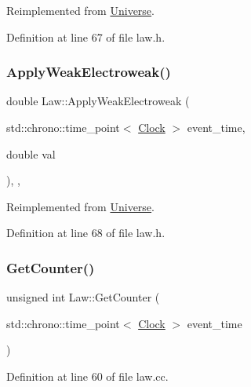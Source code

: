 Reimplemented from \mbox{\hyperlink{class_universe_a6d1226b3adec3c42a833afdbb6a65a92}{Universe}}.



Definition at line 67 of file law.\+h.

\mbox{\label{class_law_ae8a5d1d09686d79f7814c8800791460b}} 
\subsubsection{\texorpdfstring{Apply\+Weak\+Electroweak()}{ApplyWeakElectroweak()}}
{\footnotesize\ttfamily double Law\+::\+Apply\+Weak\+Electroweak (\begin{DoxyParamCaption}\item[{std\+::chrono\+::time\+\_\+point$<$ \mbox{\hyperlink{universe_8h_a0ef8d951d1ca5ab3cfaf7ab4c7a6fd80}{Clock}} $>$}]{event\+\_\+time,  }\item[{double}]{val }\end{DoxyParamCaption})\hspace{0.3cm}{\ttfamily [inline]}, {\ttfamily [final]}, {\ttfamily [virtual]}}



Reimplemented from \mbox{\hyperlink{class_universe_a46a906baabb63e5d31f8b48ea1fae52e}{Universe}}.



Definition at line 68 of file law.\+h.

\mbox{\label{class_law_ab30a86ef88a85e13d3e598caa45bff05}} 
\subsubsection{\texorpdfstring{Get\+Counter()}{GetCounter()}}
{\footnotesize\ttfamily unsigned int Law\+::\+Get\+Counter (\begin{DoxyParamCaption}\item[{std\+::chrono\+::time\+\_\+point$<$ \mbox{\hyperlink{universe_8h_a0ef8d951d1ca5ab3cfaf7ab4c7a6fd80}{Clock}} $>$}]{event\+\_\+time }\end{DoxyParamCaption})}



Definition at line 60 of file law.\+cc.

